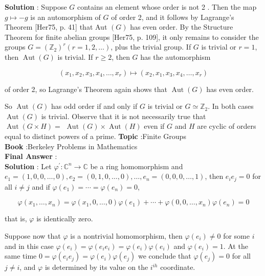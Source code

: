 \documentclass[10pt]{article}
\begin{document}
\textbf{Solution} : Suppose $G$ contains an element whose order is not 2 . Then the map $g \mapsto-g$ is an automorphism of $G$ of order 2, and it follows by Lagrange's Theorem [Her75, p. 41] that Aut $(G)$ has even order. By the Structure Theorem for finite abelian groups [Her75, p. 109], it only remains to consider the groups $G=\left(\mathbb{Z}_{2}\right)^{r}(r=1,2, \ldots)$, plus the trivial group. If $G$ is trivial or $r=1$, then $\operatorname{Aut}(G)$ is trivial. If $r \geqslant 2$, then $G$ has the automorphism

$$
\left(x_{1}, x_{2}, x_{3}, x_{4}, \ldots, x_{r}\right) \mapsto\left(x_{2}, x_{1}, x_{3}, x_{4}, \ldots, x_{r}\right)
$$

of order 2, so Lagrange's Theorem again shows that $\operatorname{Aut}(G)$ has even order.

So $\operatorname{Aut}(G)$ has odd order if and only if $G$ is trivial or $G \simeq \mathbb{Z}_{2}$. In both cases $\operatorname{Aut}(G)$ is trivial. Observe that it is not necessarily true that $\operatorname{Aut}(G \times H)=$ $\operatorname{Aut}(G) \times \operatorname{Aut}(H)$ even if $G$ and $H$ are cyclic of orders equal to distinct powers of a prime.
\textbf{Topic} :Finite Groups \\
\textbf{Book} :Berkeley Problems in Mathematics\\
\textbf{Final Answer} :\\


\textbf{Solution} : Let $\varphi^{\prime}: \mathbb{C}^{n} \rightarrow \mathbb{C}$ be a ring homomorphism and $e_{1}=(1,0,0, \ldots, 0), e_{2}=(0,1,0, \ldots, 0), \ldots, e_{n}=(0,0,0, \ldots, 1)$, then $e_{i} e_{j}=0$ for all $i \neq j$ and if $\varphi\left(e_{1}\right)=\cdots=\varphi\left(e_{n}\right)=0$,

$$
\varphi\left(x_{1}, \ldots, x_{n}\right)=\varphi\left(x_{1}, 0, \ldots, 0\right) \varphi\left(e_{1}\right)+\cdots+\varphi\left(0,0, \ldots, x_{n}\right) \varphi\left(e_{n}\right)=0
$$

that is, $\varphi$ is identically zero.

Suppose now that $\varphi$ is a nontrivial homomorphism, then $\varphi\left(e_{i}\right) \neq 0$ for some $i$ and in this case $\varphi\left(e_{i}\right)=\varphi\left(e_{i} e_{i}\right)=\varphi\left(e_{i}\right) \varphi\left(e_{i}\right)$ and $\varphi\left(e_{i}\right)=1$. At the same time $0=\varphi\left(e_{i} e_{j}\right)=\varphi\left(e_{i}\right) \varphi\left(e_{j}\right)$ we conclude that $\varphi\left(e_{j}\right)=0$ for all $j \neq i$, and $\varphi$ is determined by its value on the $i^{i h}$ coordinate.
\end{document}
